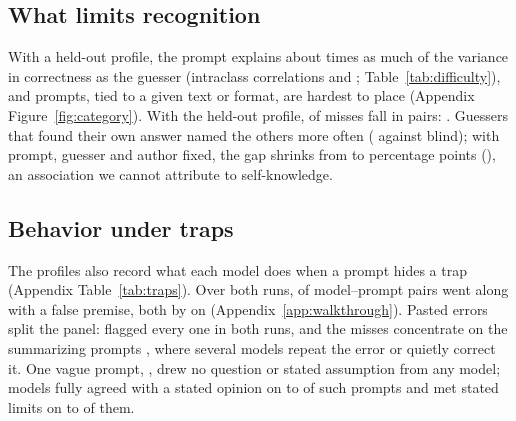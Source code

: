 \documentclass[11pt]{article}
\begin{document}
\subsection{What limits recognition}
\label{sec:difficulty}
\begin{table}[t]
\centering\small
\caption{Prompts, guessers and authors in the guessing game, run \texttt{oct-23-26}. Left: share of the variance in correctness between prompts, guessers and authors. Right: how many more of the others' answers a guesser named correctly when it also found its own, raw and with prompt, guesser and author fixed effects (percentage points; interval resamples prompts).}
\label{tab:difficulty}
\resizebox{\linewidth}{!}{}
\end{table}
With a held-out profile, the prompt explains about \iccRatioWord{} times as much of the variance in correctness as the guesser (intraclass correlations \iccPromptHeldPerm{} and \iccGuesserHeldPerm{}; Table~\ref{tab:difficulty}), and \catBottomHeldPerm{} prompts, tied to a given text or format, are hardest to place (Appendix Figure~\ref{fig:category}).
With the held-out profile, \pairsShareHeldPerm{} of misses fall in \nPairs{} pairs: \pairsHeldPerm{}.
Guessers that found their own answer named the others more often (\ownFoundBlind{} against \ownNotBlind{} blind); with prompt, guesser and author fixed, the gap shrinks from \ownRawBlind{} to \ownWithinBlind{} percentage points (\ownWithinCIBlind), an association we cannot attribute to self-knowledge.

\subsection{Behavior under traps}
\label{sec:traps}
The profiles also record what each model does when a prompt hides a trap (Appendix Table~\ref{tab:traps}).
Over both runs, \fpMissed{} of \fpTotal{} model--prompt pairs went along with a false premise, both by \fpModel{} on \fpPrompt{} (Appendix~\ref{app:walkthrough}).
Pasted errors split the panel: \errPerfect{} flagged every one in both runs, and the misses concentrate on the summarizing prompts \errMissIds{}, where several models repeat the error or quietly correct it.
One vague prompt, \ambNone{}, drew no question or stated assumption from any model; models fully agreed with a stated opinion on \agreeLow{} to \agreeHigh{} of such prompts and met stated limits on \limitsLow{} to \limitsHigh{} of them.
\end{document}
